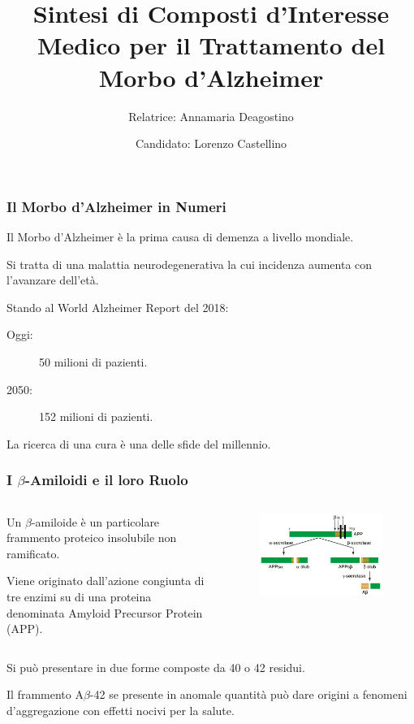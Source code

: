 \documentclass[9pt]{beamer}
\title{Sintesi di Composti d'Interesse Medico per il Trattamento del Morbo d'Alzheimer}
\author{
	Relatrice: Annamaria Deagostino
	\and
	Candidato: Lorenzo Castellino
}
\date{\center{Anno Accademico 2018-2019}}
\begin{document}
\begin{frame}
	\titlepage
\end{frame}

\begin{frame}
	\frametitle{Il Morbo d'Alzheimer in Numeri}
	Il Morbo d'Alzheimer è la prima causa di demenza a livello mondiale.
	
	Si tratta di una malattia neurodegenerativa la cui incidenza aumenta con l'avanzare dell'età.
	
	Stando al World Alzheimer Report del 2018:
	
	\begin{description}
		\item [Oggi:] 50 milioni di pazienti.
		      
		\item [2050:] 152 milioni di pazienti.
		      
	\end{description}
	
	La ricerca di una cura è una delle sfide del millennio.
\end{frame}

\begin{frame}
	\frametitle{I $\beta$-Amiloidi e il loro Ruolo}
	\bigskip
	\begin{columns}
		\begin{column}{0.5\textwidth}
			Un $\beta$-amiloide è un particolare frammento proteico insolubile non ramificato.
			
			\smallskip
			Viene originato dall'azione congiunta di tre enzimi su di una proteina denominata Amyloid Precursor Protein (APP).
		\end{column}
		\begin{column}{0.5\textwidth}
			
			\begin{figure}
				\includegraphics[width=\textwidth]{immagini/APP.png}
			\end{figure}
		\end{column}
	\end{columns}
	
	\medskip
	Si può presentare in due forme composte da 40 o 42 residui.
	
	Il frammento A$\beta$-42 se presente in anomale quantità può dare origini a fenomeni d'aggregazione con effetti nocivi per la salute.
	
\end{frame}
\end{document}
